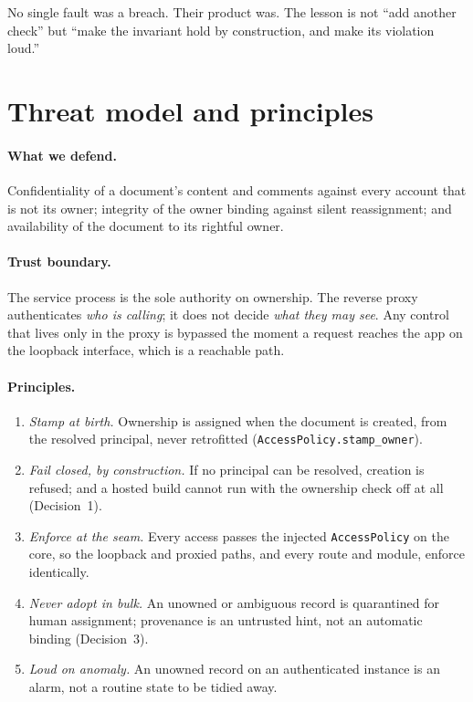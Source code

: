 \documentclass[11pt]{article}
\begin{document}
No single fault was a breach. Their product was. The lesson is not ``add another check'' but
``make the invariant hold by construction, and make its violation loud.''

\section{Threat model and principles}
\label{sec:principles}

\paragraph{What we defend.} Confidentiality of a document's content and comments against every
account that is not its owner; integrity of the owner binding against silent reassignment; and
availability of the document to its rightful owner.

\paragraph{Trust boundary.} The service process is the sole authority on ownership. The reverse
proxy authenticates \emph{who is calling}; it does not decide \emph{what they may see}. Any
control that lives only in the proxy is bypassed the moment a request reaches the app on the
loopback interface, which is a reachable path.

\paragraph{Principles.}
\begin{enumerate}[leftmargin=1.6em]
  \item \emph{Stamp at birth.} Ownership is assigned when the document is created, from the
  resolved principal, never retrofitted (\texttt{AccessPolicy.stamp\_owner}).
  \item \emph{Fail closed, by construction.} If no principal can be resolved, creation is
  refused; and a hosted build cannot run with the ownership check off at all (Decision~1).
  \item \emph{Enforce at the seam.} Every access passes the injected \texttt{AccessPolicy} on the
  core, so the loopback and proxied paths, and every route and module, enforce identically.
  \item \emph{Never adopt in bulk.} An unowned or ambiguous record is quarantined for human
  assignment; provenance is an untrusted hint, not an automatic binding (Decision~3).
  \item \emph{Loud on anomaly.} An unowned record on an authenticated instance is an alarm, not
  a routine state to be tidied away.
\end{enumerate}
\end{document}
